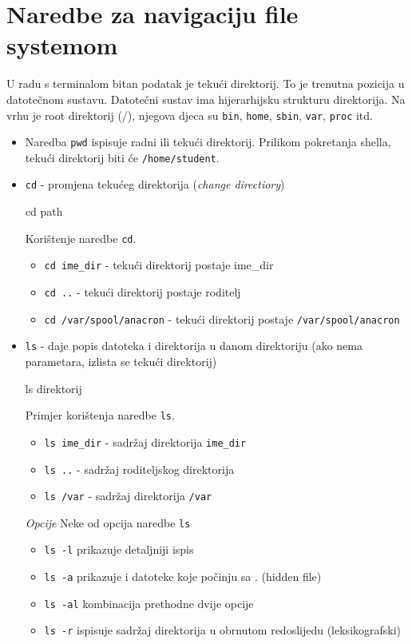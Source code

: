 \section{Naredbe za navigaciju file systemom}
U radu s terminalom bitan podatak je tekući direktorij. To je trenutna pozicija u datotečnom sustavu.
Datotečni sustav ima hijerarhijsku strukturu direktorija. Na vrhu je root direktorij (/), njegova djeca su \texttt{bin}, \texttt{home}, \texttt{sbin}, \texttt{var}, \texttt{proc} itd.
\begin{itemize}
\item Naredba \texttt{pwd} ispisuje radni ili tekući direktorij. Prilikom pokretanja shella, tekući direktorij biti će \texttt{/home/student}.
\item \texttt{cd} - promjena tekućeg direktorija (\textit{change directiory})
\begin{prototip}
cd path
\end{prototip}

\begin{primjer} Korištenje naredbe \texttt{cd}.
\begin{itemize}
\item \texttt{cd ime\_dir} - tekući direktorij postaje ime\_dir
\item \texttt{cd ..} - tekući direktorij postaje roditelj
\item \texttt{cd /var/spool/anacron} - tekući direktorij postaje \texttt{/var/spool/anacron}
\end{itemize}
\end{primjer}

\item \texttt{ls} - daje popis datoteka i direktorija u danom direktoriju (ako nema parametara, izlista se tekući direktorij)
\begin{prototip}
ls direktorij
\end{prototip}
\begin{primjer} Primjer korištenja naredbe \texttt{ls}.
\begin{itemize}
 \item \texttt{ls ime\_dir} - sadržaj direktorija \texttt{ime\_dir}
\item \texttt{ls ..} - sadržaj roditeljskog direktorija
\item \texttt{ls /var} - sadržaj direktorija \texttt{/var}
\end{itemize}
 \textit{Opcije}
\newline Neke od opcija naredbe \texttt{ls}
\begin{itemize}
\item \texttt{ls -l} prikazuje detaljniji ispis
 \item \texttt{ls -a} prikazuje i datoteke koje počinju sa . (hidden file)
\item \texttt{ls -al} kombinacija prethodne dvije opcije
\item \texttt{ls -r} ispisuje sadržaj direktorija u obrnutom redoslijedu (leksikografski)
\end{itemize}
\end{primjer}


\end{itemize}
